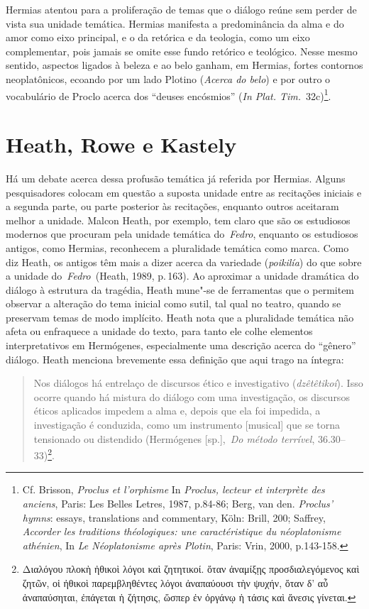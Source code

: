Hermias atentou para a proliferação de temas que o diálogo reúne sem
perder de vista sua unidade temática. Hermias manifesta a predominância
da alma e do amor como eixo principal, e o da retórica e da teologia,
como um eixo complementar, pois jamais se omite esse fundo retórico e
teológico. Nesse mesmo sentido, aspectos ligados à beleza e ao belo
ganham, em Hermias, fortes contornos neoplatônicos, ecoando por um lado
Plotino (\emph{Acerca do belo}) e por outro o vocabulário de Proclo
acerca dos ``deuses encósmios'' (\emph{In Plat. Tim.}~32c)\footnote{Cf.
  Brisson,  \emph{Proclus et l'orphisme} In \emph{Proclus, lecteur et
  interprète des anciens}, Paris: Les Belles Letres, 1987, p.84-86;
  Berg,  van den. \emph{Proclus' hymns}: essays, translations and
  commentary, Köln: Brill, 200; Saffrey,  \emph{Accorder les
  traditions théologiques: une caractéristique du néoplatonisme
  athénien}, In \emph{Le Néoplatonisme après Plotin}, Paris: Vrin, 2000,
  p.143-158.}.

 

\section{Heath, Rowe e Kastely}

 

Há um debate acerca dessa profusão temática já referida por Hermias.
Alguns pesquisadores colocam em questão a suposta unidade entre as
recitações iniciais e a segunda parte, ou parte posterior às recitações,
enquanto outros aceitaram melhor a unidade. Malcon Heath, por exemplo,
tem claro que são os estudiosos modernos que procuram pela unidade
temática do~\emph{Fedro}, enquanto os estudiosos antigos, como Hermias,
reconhecem a pluralidade temática como marca. Como diz Heath, os antigos
têm mais a dizer acerca da variedade (\emph{poikilía}) do que sobre a 
unidade do~\emph{Fedro~}(Heath, 1989, p.\,163). Ao aproximar a unidade
dramática do diálogo à estrutura da tragédia, Heath mune"-se de
ferramentas que o permitem observar a alteração do tema inicial como
sutil, tal qual no teatro, quando se preservam temas de modo implícito.
Heath nota que a pluralidade temática não afeta ou enfraquece a unidade
do texto, para tanto ele colhe elementos interpretativos em Hermógenes,
especialmente uma descrição acerca do ``gênero'' diálogo. Heath menciona
brevemente essa definição que aqui trago na íntegra:

 

\begin{quote}
Nos diálogos há entrelaço de discursos ético e investigativo
(\emph{dzêtêtikoí}). Isso ocorre quando há mistura do diálogo com uma
investigação, os discursos éticos aplicados impedem a alma e, depois que
ela foi impedida, a investigação é conduzida, como um instrumento
[musical] que se torna tensionado ou distendido (Hermógenes
[sp.],~\emph{Do método terrível}, 36.30--33)\footnote{Διαλόγου πλοκὴ
  ἠθικοὶ λόγοι καὶ ζητητικοί. ὅταν ἀναμίξῃς προσδιαλεγόμενος καὶ ζητῶν,
  οἱ ἠθικοὶ παρεμβληθέντες λόγοι ἀναπαύουσι τὴν ψυχήν, ὅταν δ' αὖ
  ἀναπαύσηται, ἐπάγεται ἡ ζήτησις, ὥσπερ ἐν ὀργάνῳ ἡ τάσις καὶ ἄνεσις
  γίνεται.}.
\end{quote}

